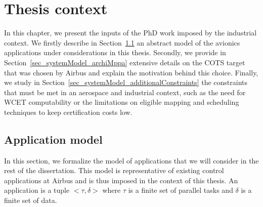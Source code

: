 \documentclass[main.tex]{subfiles}
\begin{document}
\chapter{Thesis context}
\thispagestyle{chapstyle}
\label{chap_systemModel}
\minitoc


In this chapter, we present the inputs of the PhD work imposed by the industrial context. We firstly describe in Section~\ref{sec_systemModel_appModel} an abstract model of the avionics applications under considerations in this thesis. Secondly, we provide in Section~\ref{sec_systemModel_archiMppa} extensive details on the COTS target that was chosen by Airbus and explain the motivation behind this choice. Finally, we study in Section~\ref{sec_systemModel_additionalConstraints} the constraints that must be met in an aerospace and industrial context, such as the need for WCET computability or the limitations on eligible mapping and scheduling techniques to keep certification costs low.





\section{Application model}
\label{sec_systemModel_appModel}

In this section, we formalize the model of applications that we will consider in the rest of the dissertation. This model is representative of existing control applications at Airbus and is thus imposed in the context of this thesis.
An application is a tuple $< \tau , \delta >$ where $\tau$ is a finite set of parallel tasks and $\delta$ is a finite set of data. 
\end{document}
